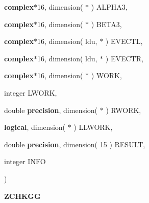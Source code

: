 {\begin{DoxyParamCaption}
\item[{{\bf complex}$\ast$16, dimension( $\ast$ )}]{A\+L\+P\+H\+A3, }
\item[{{\bf complex}$\ast$16, dimension( $\ast$ )}]{B\+E\+T\+A3, }
\item[{{\bf complex}$\ast$16, dimension( ldu, $\ast$ )}]{E\+V\+E\+C\+T\+L, }
\item[{{\bf complex}$\ast$16, dimension( ldu, $\ast$ )}]{E\+V\+E\+C\+T\+R, }
\item[{{\bf complex}$\ast$16, dimension( $\ast$ )}]{W\+O\+R\+K, }
\item[{integer}]{L\+W\+O\+R\+K, }
\item[{double {\bf precision}, dimension( $\ast$ )}]{R\+W\+O\+R\+K, }
\item[{{\bf logical}, dimension( $\ast$ )}]{L\+L\+W\+O\+R\+K, }
\item[{double {\bf precision}, dimension( 15 )}]{R\+E\+S\+U\+L\+T, }
\item[{integer}]{I\+N\+F\+O}
\end{DoxyParamCaption}
)}\label{group__complex16__eig_ga0b24cd17637a0c7c2689c338e3beb720}


{\bfseries Z\+C\+H\+K\+G\+G} 

